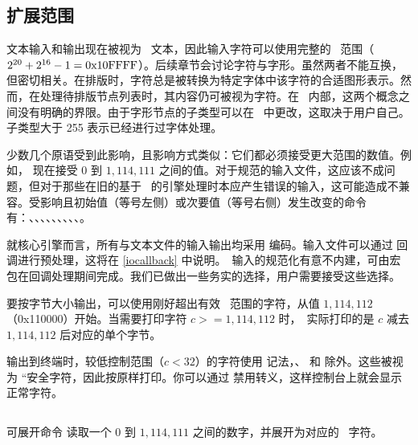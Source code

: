 \subsection{扩展范围}

\topicindex{\UNICODE}

文本输入和输出现在被视为 \UNICODE\ 文本，因此输入字符可以使用完整的 \UNICODE\ 范围（$2^{20}+2^{16}-1 = \hbox{0x10FFFF}$）。后续章节会讨论字符与字形。虽然两者不能互换，但密切相关。在排版时，字符总是被转换为特定字体中该字符的合适图形表示。然而，在处理待排版节点列表时，其内容仍可被视为字符。在 \LUATEX\ 内部，这两个概念之间没有明确的界限。由于字形节点的子类型可以在 \LUA\ 中更改，这取决于用户自己。子类型大于 255 表示已经进行过字体处理。

少数几个原语受到此影响，且影响方式类似：它们都必须接受更大范围的数值。例如， 现在接受 0 到 $1{,}114{,}111$ 之间的值。对于规范的输入文件，这应该不成问题，但对于那些在旧的基于 \TEX\ 的引擎处理时本应产生错误的输入，这可能造成不兼容。受影响且初始值（等号左侧）或次要值（等号右侧）发生改变的命令有：、、、、、、、、、。

就核心引擎而言，所有与文本文件的输入输出均采用  编码。输入文件可以通过  回调进行预处理，这将在 \ref{iocallback} 中说明。\UNICODE\ 输入的规范化有意不内建，可由宏包在回调处理期间完成。我们已做出一些务实的选择，用户需要接受这些选择。

要按字节大小输出，可以使用刚好超出有效 \UNICODE\ 范围的字符，从值 $1{,}114{,}112$（0x110000）开始。当需要打印字符 $c>=1{,}114{,}112$ 时，\LUATEX\ 实际打印的是 $c$ 减去 $1{,}114{,}112$ 后对应的单个字节。

输出到终端时，较低控制范围（$c<32$）的字符使用 \type {\textasciicircum\textasciicircum{}} 记法，、 和  除外。这些被视为 ``安全字符，因此按原样打印。你可以通过  禁用转义，这样控制台上就会显示正常字符。

\subsection{}

\topicindex{\UNICODE}

可展开命令  读取一个 0 到 $1{,}114{,}111$ 之间的数字，并展开为对应的 \UNICODE\ 字符。

